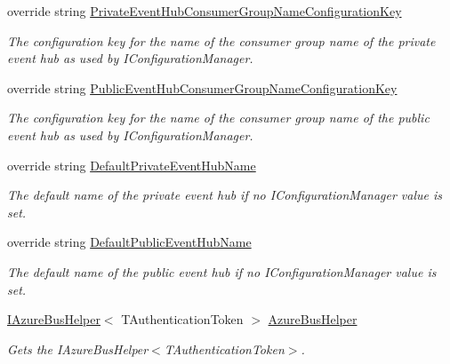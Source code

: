 \begin{DoxyCompactItemize}
override string \hyperlink{classCqrs_1_1Azure_1_1ServiceBus_1_1AzureEventHubBus_a2ef9980a763a789179a009d6e0972175_a2ef9980a763a789179a009d6e0972175}{Private\+Event\+Hub\+Consumer\+Group\+Name\+Configuration\+Key}
\begin{DoxyCompactList}\small\item\em The configuration key for the name of the consumer group name of the private event hub as used by I\+Configuration\+Manager. \end{DoxyCompactList}\item 
override string \hyperlink{classCqrs_1_1Azure_1_1ServiceBus_1_1AzureEventHubBus_a5e03e9ddac66cf136bde75e40fc11afc_a5e03e9ddac66cf136bde75e40fc11afc}{Public\+Event\+Hub\+Consumer\+Group\+Name\+Configuration\+Key}
\begin{DoxyCompactList}\small\item\em The configuration key for the name of the consumer group name of the public event hub as used by I\+Configuration\+Manager. \end{DoxyCompactList}\item 
override string \hyperlink{classCqrs_1_1Azure_1_1ServiceBus_1_1AzureEventHubBus_a8903cb16fa7bfc2396f249c48fe42a60_a8903cb16fa7bfc2396f249c48fe42a60}{Default\+Private\+Event\+Hub\+Name}
\begin{DoxyCompactList}\small\item\em The default name of the private event hub if no I\+Configuration\+Manager value is set. \end{DoxyCompactList}\item 
override string \hyperlink{classCqrs_1_1Azure_1_1ServiceBus_1_1AzureEventHubBus_a0d3aa3a2e36b52d131039955700955cb_a0d3aa3a2e36b52d131039955700955cb}{Default\+Public\+Event\+Hub\+Name}
\begin{DoxyCompactList}\small\item\em The default name of the public event hub if no I\+Configuration\+Manager value is set. \end{DoxyCompactList}\item 
\hyperlink{interfaceCqrs_1_1Azure_1_1ServiceBus_1_1IAzureBusHelper}{I\+Azure\+Bus\+Helper}$<$ T\+Authentication\+Token $>$ \hyperlink{classCqrs_1_1Azure_1_1ServiceBus_1_1AzureEventHubBus_ac70c513a41f42208cc3332d4ed855af8_ac70c513a41f42208cc3332d4ed855af8}{Azure\+Bus\+Helper}
\begin{DoxyCompactList}\small\item\em Gets the I\+Azure\+Bus\+Helper$<$\+T\+Authentication\+Token$>$. \end{DoxyCompactList}\end{DoxyCompactItemize}

